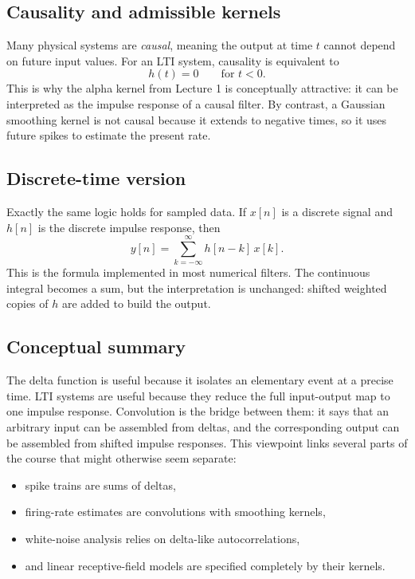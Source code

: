 \documentclass[11pt]{article}
\begin{document}
\subsection{Causality and admissible kernels}

Many physical systems are \emph{causal}, meaning the output at time $t$ cannot depend on future input values. For an LTI system, causality is equivalent to
\[
h(t)=0 \qquad \text{for } t<0.
\]
This is why the alpha kernel from Lecture 1 is conceptually attractive: it can be interpreted as the impulse response of a causal filter. By contrast, a Gaussian smoothing kernel is not causal because it extends to negative times, so it uses future spikes to estimate the present rate.

\subsection{Discrete-time version}

Exactly the same logic holds for sampled data. If $x[n]$ is a discrete signal and $h[n]$ is the discrete impulse response, then
\[
y[n]=\sum_{k=-\infty}^{\infty} h[n-k]\,x[k].
\]
This is the formula implemented in most numerical filters. The continuous integral becomes a sum, but the interpretation is unchanged: shifted weighted copies of $h$ are added to build the output.

\subsection{Conceptual summary}

The delta function is useful because it isolates an elementary event at a precise time. LTI systems are useful because they reduce the full input-output map to one impulse response. Convolution is the bridge between them: it says that an arbitrary input can be assembled from deltas, and the corresponding output can be assembled from shifted impulse responses. This viewpoint links several parts of the course that might otherwise seem separate:
\begin{itemize}
    \item spike trains are sums of deltas,
    \item firing-rate estimates are convolutions with smoothing kernels,
    \item white-noise analysis relies on delta-like autocorrelations,
    \item and linear receptive-field models are specified completely by their kernels.
\end{itemize}
\end{document}
